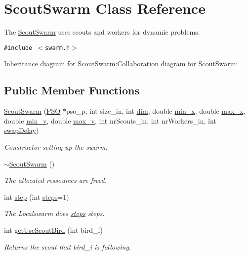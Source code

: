\hypertarget{classScoutSwarm}{
\section{ScoutSwarm Class Reference}
\label{classScoutSwarm}
}
The \hyperlink{classScoutSwarm}{ScoutSwarm} uses scouts and workers for dynamic problems.  


{\tt \#include $<$swarm.h$>$}

Inheritance diagram for ScoutSwarm:Collaboration diagram for ScoutSwarm:\subsection*{Public Member Functions}
\begin{CompactItemize}
\item 
\hyperlink{classScoutSwarm_2698fea9f0ae474d43aee1c246235ed3}{ScoutSwarm} (\hyperlink{classPSO}{PSO} $\ast$pso\_\-p, int size\_\-in, int \hyperlink{runpso_8cpp_70b5e28b5bc3d1b63a7435c5fe50b837}{dim}, double \hyperlink{classSwarm_b504e23c39413573e3685a88435f5f85}{min\_\-x}, double \hyperlink{classSwarm_e5075d21be96c1cdf441bc2b612177c1}{max\_\-x}, double \hyperlink{classSwarm_160c79397ea811636e17c0e4d6297729}{min\_\-v}, double \hyperlink{classSwarm_2b0dbde2c275f991580a07a745cb5ade}{max\_\-v}, int nrScouts\_\-in, int nrWorkers\_\-in, int \hyperlink{classScoutSwarm_337dd6e4974bfe13d02985c393657bf2}{swapDelay})
\begin{CompactList}\small\item\em Constructor setting up the swarm. \item\end{CompactList}\item 
\hyperlink{classScoutSwarm_00b7c0dcdeeeec07fe2d70eb66fe0a65}{$\sim$ScoutSwarm} ()
\begin{CompactList}\small\item\em The allocated ressources are freed. \item\end{CompactList}\item 
int \hyperlink{classScoutSwarm_4b8c1a2e57b949b3259c118fbadcb781}{step} (int \hyperlink{runpso_8cpp_b4ae7205573977222eadd0795db193e2}{steps}=1)
\begin{CompactList}\small\item\em The Localswarm does \hyperlink{runpso_8cpp_b4ae7205573977222eadd0795db193e2}{steps} steps. \item\end{CompactList}\item 
int \hyperlink{classScoutSwarm_9a2a45ebe72cf9302d5d30270efbca1d}{getUseScoutBird} (int bird\_\-i)
\begin{CompactList}\small\item\em Returns the scout that bird\_\-i is following. \item\end{CompactList}\end{CompactItemize}
